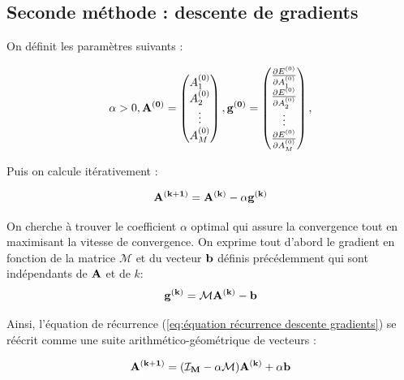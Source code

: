 \documentclass[12pt]{report}
\begin{document}
\subsection{Seconde méthode : descente de gradients}

On définit les paramètres suivants :

\begin{equation}
    \alpha>0, 
    \bf{A}^{(0)} = \begin{pmatrix}
                A_1^{(0)} \\
                A_2^{(0)} \\
                \vdots \\
                A_M^{(0)}
              \end{pmatrix},
    \bf{g}^{(0)} = \begin{pmatrix}
                \frac{\partial E^{(0)}}{\partial A_1^{(0)}} \\
                \frac{\partial E^{(0)}}{\partial A_2^{(0)}} \\
                \vdots \\
                \frac{\partial E^{(0)}}{\partial A_M^{(0)}}
              \end{pmatrix},     
\label{eq:définition descente de gradients}
\end{equation}

Puis on calcule itérativement :

\begin{equation}
    \bf{A}^{(k+1)} = \bf{A}^{(k)} - \alpha\bf{g}^{(k)} 
\label{eq:équation récurrence descente gradients}
\end{equation}

On cherche à trouver le coefficient $\alpha$ optimal qui assure la convergence tout en maximisant la vitesse de convergence.
On exprime tout d'abord le gradient en fonction de la matrice $\mathcal{M}$ et du vecteur $\bf{b}$ définis précédemment qui sont indépendants de $\bf{A}$ et de $k$:
\begin{equation}
    \bf{g}^{(k)} = \mathcal{M}\bf{A}^{(k)} - \bf{b}
\label{eq:expression matricielle gradient}
\end{equation}

Ainsi, l'équation de récurrence (\ref{eq:équation récurrence descente gradients}) se réécrit comme une suite arithmético-géométrique de vecteurs :

\begin{equation}
    \bf{A}^{(k+1)} = (\mathcal{I}_M - \alpha \mathcal{M} )  \bf{A}^{(k)} + \alpha\bf{b}
\label{eq:équation récurrence descente gradients v2}
\end{equation}
\end{document}
